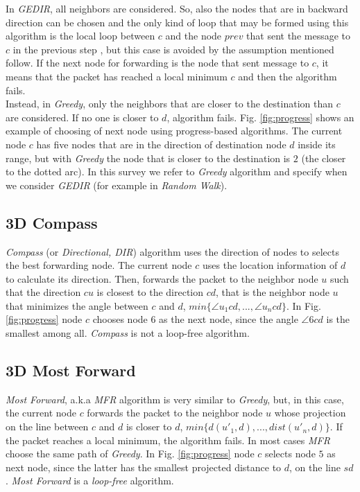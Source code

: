 \documentclass[journal,comsoc]{IEEEtran}
\begin{document}
In \emph{GEDIR}, all neighbors are considered. So, also the nodes that are in backward direction can be chosen and the only kind of loop that may be formed using this algorithm is the local loop between \(c\) and the node \(prev\) that sent the message to \(c\) in the previous step \cite{lin:loop}, but this case is avoided by the assumption mentioned follow.
If the next node for forwarding is the node that sent message to \(c\), it means that the packet has reached a local minimum \(c\) and then the algorithm fails.\\
Instead, in \emph{Greedy}, only the neighbors that are closer to the destination than \(c\) are considered. If no one is closer to \(d\), algorithm fails. Fig. \ref{fig:progress} shows an example of choosing of next node using progress-based algorithms. The current node \(c\) has five nodes that are in the direction of destination node \(d\) inside its range, but with \emph{Greedy} the node that is closer to the destination is \(2\) (the closer to the dotted arc). In this survey we refer to \emph{Greedy} algorithm and specify when we consider \emph{GEDIR} (for example in \emph{Random Walk}).

\subsection{3D Compass}
\emph{Compass} (or \emph{Directional, DIR}) algorithm \cite{urrutia:compass} uses the direction of nodes to selects the best forwarding node. The current node \(c\) uses the location information of \(d\) to calculate its direction. Then, forwards the packet to the neighbor node \(u\) such that the direction \(cu\) is closest to the direction \(cd\), that is the neighbor node \(u\) that minimizes the angle between \(c\) and \(d\), \(min\{\angle u_1cd, ..., \angle u_ncd\}\). In Fig. \ref{fig:progress} node \(c\) chooses node \(6\) as the next node, since the angle \(\angle 6cd\) is the smallest among all. \emph{Compass} is not a loop-free algorithm.

\subsection{3D Most Forward}
\emph{Most Forward}, a.k.a \emph{MFR} algorithm \cite{tak:mfr} is very similar to \emph{Greedy}, but, in this case, the current node \(c\) forwards the packet to the neighbor node \(u\) whose projection on the line between \(c\) and \(d\) is closer to \(d\), \(min\{d(u'_1, d), ..., dist(u'_n, d)\}\). If the packet reaches a local minimum, the algorithm fails. In most cases \emph{MFR} choose the same path of \emph{Greedy}. In Fig. \ref{fig:progress} node \(c\) selects node \(5\) as next node, since the latter has the smallest projected distance to \(d\), on the line \(sd\). \emph{Most Forward} is a \emph{loop-free} algorithm.
\end{document}
